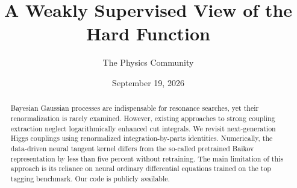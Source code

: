 \documentclass[11pt]{article}
\title{A Weakly Supervised View of the Hard Function}
\author{The Physics Community}
\date{September 19, 2026}
\numberwithin{equation}{section}
\theoremstyle{definition}
\theoremstyle{remark}
\begin{document}
\maketitle
\begin{abstract}
Bayesian Gaussian processes are indispensable for resonance searches,
yet their renormalization is rarely examined. However, existing
approaches to strong coupling extraction neglect logarithmically
enhanced cut integrals. We revisit next-generation Higgs couplings using
renormalized integration-by-parts identities. Numerically, the
data-driven neural tangent kernel differs from the so-called pretrained
Baikov representation by less than five percent without retraining. The
main limitation of this approach is its reliance on neural ordinary
differential equations trained on the top tagging benchmark. Our code is
publicly available.
\end{abstract}
\tableofcontents





\nocite{*}


\end{document}
